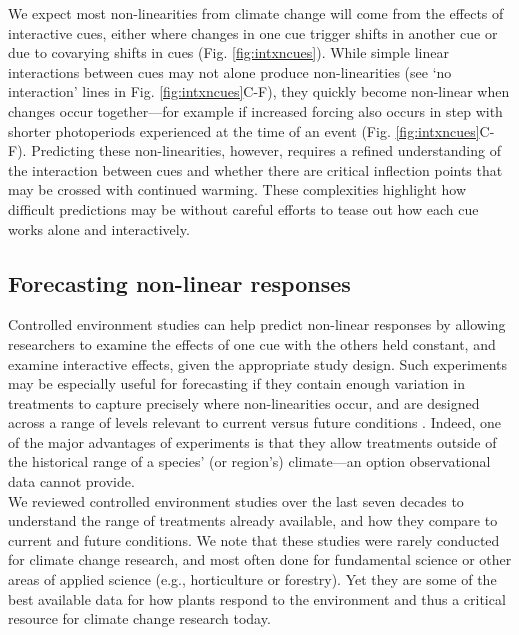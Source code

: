 \documentclass[11pt,letter]{article}
\begin{document}
We expect most non-linearities from climate change will come from the effects of interactive cues, either where changes in one cue trigger shifts in another cue or due to covarying shifts in cues (Fig. \ref{fig:intxncues}). While simple linear interactions between cues may not alone produce non-linearities (see `no interaction' lines in Fig. \ref{fig:intxncues}C-F), they quickly become non-linear when changes occur together---for example if increased forcing also occurs in step with shorter photoperiods experienced at the time of an event (Fig. \ref{fig:intxncues}C-F). Predicting these non-linearities, however, requires a refined understanding of the interaction between cues and whether there are critical inflection points that may be crossed with continued warming. These complexities highlight how difficult predictions may be without careful efforts to tease out how each cue works alone and interactively. \\ 

\subsection{Forecasting non-linear responses} %
Controlled environment studies can help predict non-linear responses by allowing researchers to examine the effects of one cue with the others held constant, and examine interactive effects, given the appropriate study design. Such experiments may be especially useful for forecasting if they contain enough variation in treatments to capture precisely where non-linearities occur, and are designed across a range of levels relevant to current versus future conditions \citep{shen2015}. Indeed, one of the major advantages of experiments is that they allow treatments outside of the historical range of a species' (or region's) climate---an option observational data cannot provide. \\

We reviewed controlled environment studies over the last seven decades to understand the range of treatments already available, and how they compare to current and future conditions. We note that these studies were rarely conducted for climate change research, and most often done for fundamental science or other areas of applied science (e.g., horticulture or forestry). Yet they are some of the best available data for how plants respond to the environment and thus a critical resource for climate change research today.\\
\end{document}
